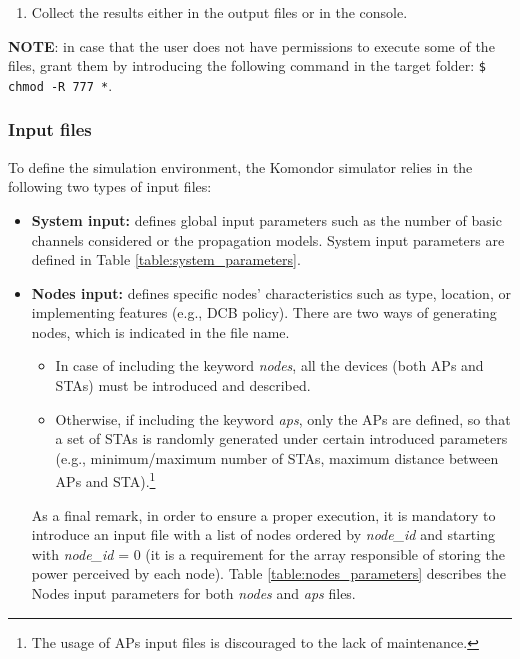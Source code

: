 \documentclass[a4paper]{article}
\begin{document}
\begin{enumerate}
\begin{itemize}
		            \item \textit{arg\_6} (FLAG\_PRINT\_SYSTEM\_LOGS): flag to indicate whether to print the system logs (1) or not (0).
		            \item \textit{arg\_7} (FLAG\_PRINT\_NODE\_LOGS): flag to indicate whether to print the nodes logs (1) or not (0).
		            \item \textit{arg\_8} (SIM\_TIME): simulation time in seconds.
		            \item \textit{arg\_9} (SEED): random seed for the experiments.
				\end{itemize}
		    \item Collect the results either in the output files or in the console.
		\end{enumerate}
	
		\textbf{NOTE}: in case that the user does not have permissions to execute some of the files, grant them by introducing the following command in the target folder: \texttt{\$ chmod -R 777 *}.
		
		\subsubsection{Input files}
		\label{section:input_files}	
		To define the simulation environment, the Komondor simulator relies in the following two types of input files:
		\begin{itemize}
			\item \textbf{System input:} defines global input parameters such as the number of basic channels considered or the propagation models. System input parameters are defined in Table \ref{table:system_parameters}.
			\item \textbf{Nodes input:} defines specific nodes' characteristics such as type, location, or implementing features (e.g., DCB policy). There are two ways of generating nodes, which is indicated in the file name. 
			
			\begin{itemize}
				\item In case of including the keyword \emph{nodes}, all the devices (both APs and STAs) must be introduced and described.
				\item Otherwise, if including the keyword \emph{aps}, only the APs are defined, so that a set of STAs is randomly generated under certain introduced parameters (e.g., minimum/maximum number of STAs, maximum distance between APs and STA).\footnote{The usage of APs input files is discouraged to the lack of maintenance.}
			\end{itemize}  
		
			As a final remark, in order to ensure a proper execution, it is mandatory to introduce an input file with a list of nodes ordered by \textit{node\_id} and starting with \textit{node\_id} = 0 (it is a requirement for the array responsible of storing the power perceived by each node). Table \ref{table:nodes_parameters} describes the Nodes input parameters for both \emph{nodes} and \emph{aps} files. 
			
		\end{itemize}		
	
\end{document}
